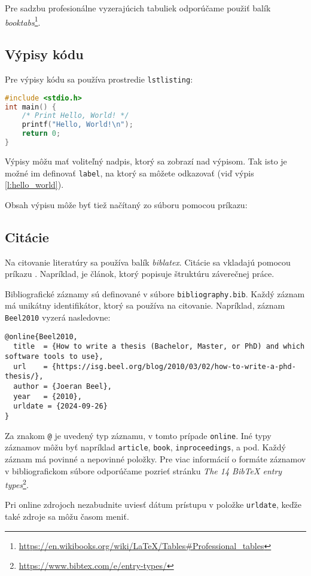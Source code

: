 Pre sadzbu profesionálne vyzerajúcich tabuliek odporúčame použiť balík \emph{booktabs}\footnote{\url{https://en.wikibooks.org/wiki/LaTeX/Tables\#Professional_tables}}.

\subsection*{Výpisy kódu}

Pre výpisy kódu sa používa prostredie \texttt{lstlisting}:

\begin{lstlisting}[language=C,caption={Program, ktorý pozdraví celý svet}, label={l:hello_world}]
#include <stdio.h>
int main() {
    /* Print Hello, World! */
    printf("Hello, World!\n");
    return 0;
}
\end{lstlisting}

Výpisy môžu mať voliteľný nadpis, ktorý sa zobrazí nad výpisom. Tak isto je možné im definovať \texttt{label}, na ktorý sa môžete odkazovať (viď výpis \ref{l:hello_world}).

Obsah výpisu môže byť tiež načítaný zo súboru pomocou príkazu:



\subsection*{Citácie}

Na citovanie literatúry sa používa balík \emph{biblatex}. Citácie sa vkladajú pomocou príkazu \verb||. Napríklad, je článok, ktorý popisuje štruktúru záverečnej práce.

Bibliografické záznamy sú definované v súbore \texttt{bibliography.bib}. Každý záznam má unikátny identifikátor, ktorý sa používa na citovanie. Napríklad, záznam \texttt{Beel2010} vyzerá nasledovne:


\begin{lstlisting}[breaklines=true, prebreak=\mbox{\textcolor{red}{$\hookleftarrow$}}]
@online{Beel2010,
  title  = {How to write a thesis (Bachelor, Master, or PhD) and which software tools to use},
  url    = {https://isg.beel.org/blog/2010/03/02/how-to-write-a-phd-thesis/},
  author = {Joeran Beel},
  year   = {2010},
  urldate = {2024-09-26}
}
\end{lstlisting}

Za znakom \texttt{@} je uvedený typ záznamu, v tomto prípade \texttt{online}. Iné typy záznamov môžu byť napríklad \texttt{article}, \texttt{book}, \texttt{inproceedings}, a pod. Každý záznam má povinné a nepovinné položky. Pre viac informácií o formáte záznamov v bibliografickom súbore odporúčame pozrieť stránku \emph{The 14 BibTeX entry types}\footnote{\url{https://www.bibtex.com/e/entry-types/}}.

Pri online zdrojoch nezabudnite uviesť dátum prístupu v položke \texttt{urldate}, keďže také zdroje sa môžu časom meniť.
